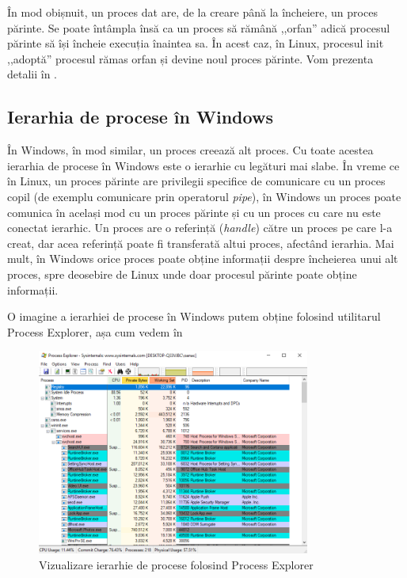 În mod obișnuit, un proces dat are, de la creare până la încheiere, un proces
părinte. Se poate întâmpla însă ca un proces să rămână ,,orfan'' adică procesul
părinte să își încheie execuția înaintea sa. În acest caz, în Linux, procesul
init ,,adoptă'' procesul rămas orfan și devine noul proces părinte. Vom prezenta
detalii în .

\subsection{Ierarhia de procese în Windows}
\label{sec:process-ierarhie-windows}

În Windows, în mod similar, un proces creează alt proces. Cu toate acestea
ierarhia de procese în Windows este o ierarhie cu legături mai slabe. În vreme
ce în Linux, un proces părinte are privilegii specifice de comunicare cu un
proces copil (de exemplu comunicare prin operatorul \textit{pipe}), în Windows un proces poate comunica în
același mod cu un proces părinte și cu un proces cu care nu este conectat
ierarhic. Un proces are o referință (\textit{handle}) către un proces pe care l-a creat, dar acea referință poate fi transferată altui proces, afectând ierarhia. Mai mult, în Windows orice proces poate obține informații despre
încheierea unui alt proces, spre deosebire de Linux unde doar procesul părinte
poate obține informații.

O imagine a ierarhiei de procese în Windows putem obține folosind utilitarul
Process Explorer, așa cum vedem în 

\begin{figure}[!htbp]
	\centering
	\includegraphics[width=0.8\textwidth]{chapters/04-process/img/process-explorer.png}
	\caption{Vizualizare ierarhie de procese folosind Process Explorer}
	\label{fig:process-process-explorer-hierarchy}
\end{figure}

